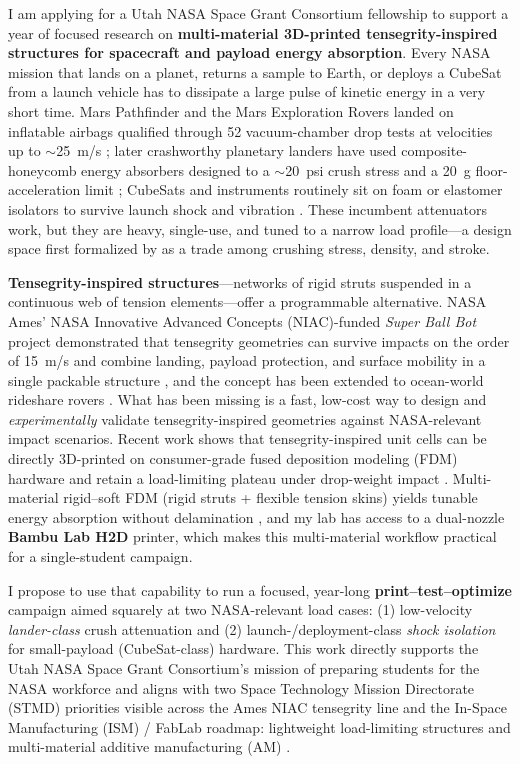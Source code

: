 \documentclass[11pt]{article}
\begin{document}
I am applying for a Utah NASA Space Grant Consortium fellowship to support a
year of focused research on \textbf{multi-material 3D-printed
tensegrity-inspired structures for spacecraft and payload energy absorption}.
Every NASA mission that lands on a planet, returns a sample to Earth, or
deploys a CubeSat from a launch vehicle has to dissipate a large pulse of
kinetic energy in a very short time.  Mars Pathfinder and the Mars Exploration
Rovers landed on inflatable airbags qualified through 52 vacuum-chamber drop
tests at velocities up to $\sim$25~m/s \citep{adams2004merairbag}; later
crashworthy planetary landers have used composite-honeycomb energy absorbers
designed to a $\sim$20~psi crush stress and a 20~g floor-acceleration limit
\citep{jackson2014honeycomb}; CubeSats and instruments routinely sit on foam
or elastomer isolators to survive launch shock and vibration
\citep{nasagsfc2018gevs}.  These incumbent attenuators work, but they are
heavy, single-use, and tuned to a narrow load profile---a design space first
formalized by \citet{cloutier1966landing} as a trade among crushing stress,
density, and stroke.

\textbf{Tensegrity-inspired structures}---networks of rigid struts suspended
in a continuous web of tension elements---offer a programmable alternative.
NASA Ames' NASA Innovative Advanced Concepts (NIAC)-funded \emph{Super Ball Bot} project demonstrated that
tensegrity geometries can survive impacts on the order of 15~m/s and combine
landing, payload protection, and surface mobility in a single packable
structure \citep{caluwaerts2014superball,agogino2018superball,sabelhaus2015system,vespignani2018design},
and the concept has been extended to ocean-world rideshare rovers
\citep{deitrich2022titan}.  What has been missing is a fast, low-cost way to
design and \emph{experimentally} validate tensegrity-inspired geometries
against NASA-relevant impact scenarios.  Recent work shows that
tensegrity-inspired unit cells can be directly 3D-printed on consumer-grade
fused deposition modeling (FDM) hardware and retain a load-limiting plateau under drop-weight impact
\citep{pajunen2019design}.  Multi-material rigid--soft FDM (rigid struts +
flexible tension skins) yields tunable energy absorption without delamination
\citep{ye2023multimaterial,khatri2024energy}, and my lab has access to a
dual-nozzle \textbf{Bambu Lab H2D} printer, which makes this multi-material
workflow practical for a single-student campaign.

I propose to use that capability to run a focused, year-long
\textbf{print--test--optimize} campaign aimed squarely at two NASA-relevant
load cases: (1) low-velocity \emph{lander-class} crush attenuation and
(2) launch-/deployment-class \emph{shock isolation} for small-payload
(CubeSat-class) hardware.  This work directly supports the Utah NASA Space
Grant Consortium's mission of preparing students for the NASA workforce and
aligns with two Space Technology Mission Directorate (STMD) priorities visible across the Ames NIAC tensegrity line
and the In-Space Manufacturing (ISM) / FabLab roadmap: lightweight
load-limiting structures and multi-material additive manufacturing (AM)
\citep{nasa2022strategic,prater2019summary,agogino2018superball}.
\end{document}
